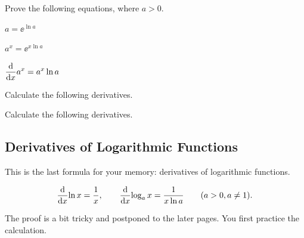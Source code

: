 \documentclass[11pt,pdfa,lastpage]{MishoNote}
\begin{document}
\ornamentskip

\begin{enumerate}[resume]
  \itemB Prove the following equations, where $a>0$.
  \begin{menumerate}{3}
    \item $a=\ee^{\ln a}$
    \item $a^x=\ee^{x\ln a}$
    \item $\displaystyle\diff{}{x}a^x=a^x\ln a$
  \end{menumerate}
  \itemS Calculate the following derivatives.
    \begin{menumerate}{4}
    \end{menumerate}
  \itemB Calculate the following derivatives.
    \begin{menumerate}{3}
    \end{menumerate}
\end{enumerate}

\newpage
\subsection{Derivatives of Logarithmic Functions}
This is the last formula for your memory: derivatives of logarithmic functions.
\begin{theorem}{}{}
  \begin{equation}
      \diff{}x{\ln x}=\frac{1}{x},\qquad
      \diff{}x{\log_a x}=\frac{1}{x\ln a}\qquad(a>0,a\neq 1).\label{eq:log-deriv}
  \end{equation}
\end{theorem}
The proof is a bit tricky and postponed to the later pages. You first practice the calculation.

\ornamentskip
\end{document}
